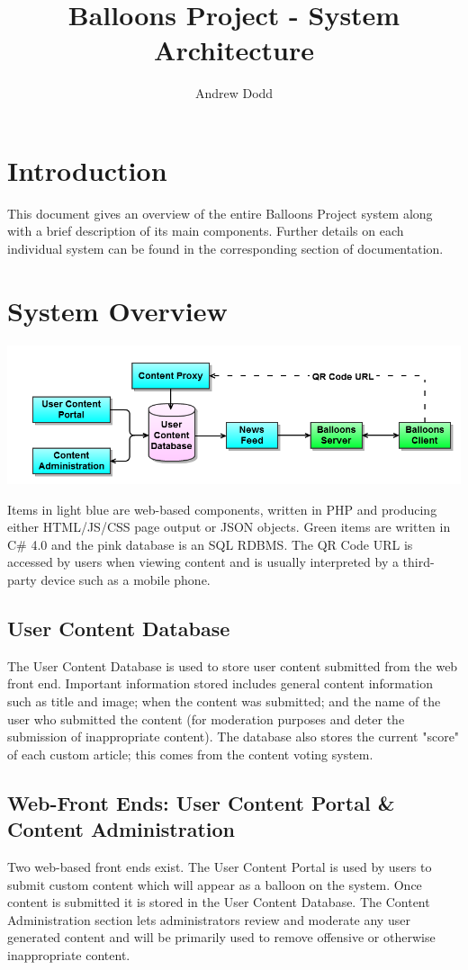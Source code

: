 \documentclass{article}
\title{Balloons Project - System Architecture}
\author{Andrew Dodd}
\begin{document}
\maketitle

\section{Introduction}
This document gives an overview of the entire Balloons Project system along 
with a brief description of its main components. Further details on each 
individual system can be found in the corresponding section of documentation.

\section{System Overview}

\includegraphics[width=\textwidth]{Diagrams/System-Architecture-Diagram.png}

Items in light blue are web-based components, written in PHP and producing 
either HTML/JS/CSS page output or JSON objects. Green items are written in C\#
4.0 and the pink database is an SQL RDBMS. The QR Code URL is accessed by users
when viewing content and is usually interpreted by a third-party device such as
a mobile phone.

\subsection{User Content Database}
The User Content Database is used to store user content submitted from the web
front end. Important information stored includes general content information 
such as title and image; when the content was submitted; and the name of the 
user who submitted the content (for moderation purposes and deter the 
submission of inappropriate content). The database also stores the current 
"score" of each custom article; this comes from the content voting system. 

\subsection{Web-Front Ends: User Content Portal \& Content Administration}
Two web-based front ends exist. The User Content Portal is used by users to 
submit custom content which will appear as a balloon on the system. Once 
content is submitted it is stored in the User Content Database. The Content
Administration section lets administrators review and moderate any user 
generated content and will be primarily used to remove offensive or otherwise
inappropriate content.
\end{document}
